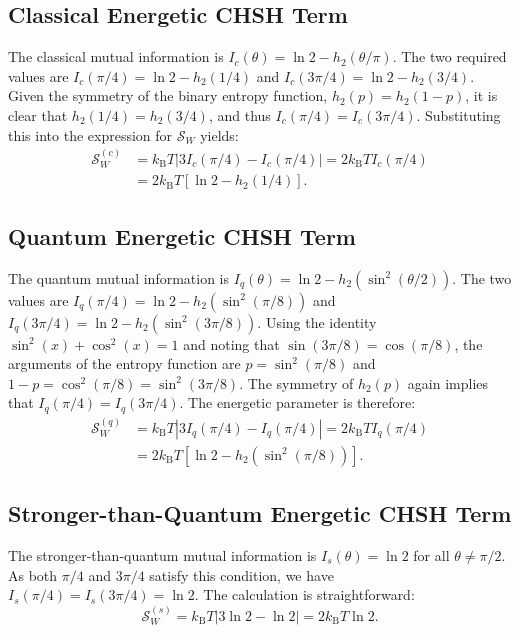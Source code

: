 \documentclass[%
  reprint,
  showpacs,
  showkeys,
  pra,
  longbibliography,
  floatfix,
  x11names
]{revtex4-2}
\begin{document}
\subsection{Classical Energetic CHSH Term}
The classical mutual information is $I_c(\theta) = \ln 2 - h_2(\theta/\pi)$.
The two required values are $I_c(\pi/4) = \ln 2 - h_2(1/4)$ and $I_c(3\pi/4) = \ln 2 - h_2(3/4)$.
Given the symmetry of the binary entropy function, $h_2(p) = h_2(1-p)$, it is clear that $h_2(1/4) = h_2(3/4)$, and thus $I_c(\pi/4) = I_c(3\pi/4)$.
Substituting this into the expression for $\mathcal{S}_W$ yields:
\begin{align}
\mathcal{S}_W^{(c)} &= k_{\mathrm{B}}T |3I_c(\pi/4) - I_c(\pi/4)| = 2 k_{\mathrm{B}}T I_c(\pi/4) \nonumber \\
&= 2 k_{\mathrm{B}}T \left[\ln 2 - h_2(1/4)\right].
\end{align}

\subsection{Quantum Energetic CHSH Term}
The quantum mutual information is $I_q(\theta) = \ln 2 - h_2(\sin^2(\theta/2))$.
The two values are $I_q(\pi/4) = \ln 2 - h_2(\sin^2(\pi/8))$ and $I_q(3\pi/4) = \ln 2 - h_2(\sin^2(3\pi/8))$.
Using the identity $\sin^2(x) + \cos^2(x) = 1$ and noting that $\sin(3\pi/8) = \cos(\pi/8)$, the arguments of the entropy function are $p = \sin^2(\pi/8)$ and $1-p = \cos^2(\pi/8) = \sin^2(3\pi/8)$. The symmetry of $h_2(p)$ again implies that $I_q(\pi/4) = I_q(3\pi/4)$.
The energetic parameter is therefore:
\begin{align}
\mathcal{S}_W^{(q)} &= k_{\mathrm{B}}T |3I_q(\pi/4) - I_q(\pi/4)| = 2 k_{\mathrm{B}}T I_q(\pi/4) \nonumber \\
&= 2 k_{\mathrm{B}}T \left[\ln 2 - h_2(\sin^2(\pi/8))\right].
\end{align}

\subsection{Stronger-than-Quantum Energetic CHSH Term}
The stronger-than-quantum mutual information is $I_s(\theta) = \ln 2$ for all $\theta \neq \pi/2$. As both $\pi/4$ and $3\pi/4$ satisfy this condition, we have $I_s(\pi/4) = I_s(3\pi/4) = \ln 2$.
The calculation is straightforward:
\begin{equation}
\mathcal{S}_W^{(s)} = k_{\mathrm{B}}T |3\ln 2 - \ln 2| = 2 k_{\mathrm{B}}T \ln 2.
\end{equation}
\end{document}
